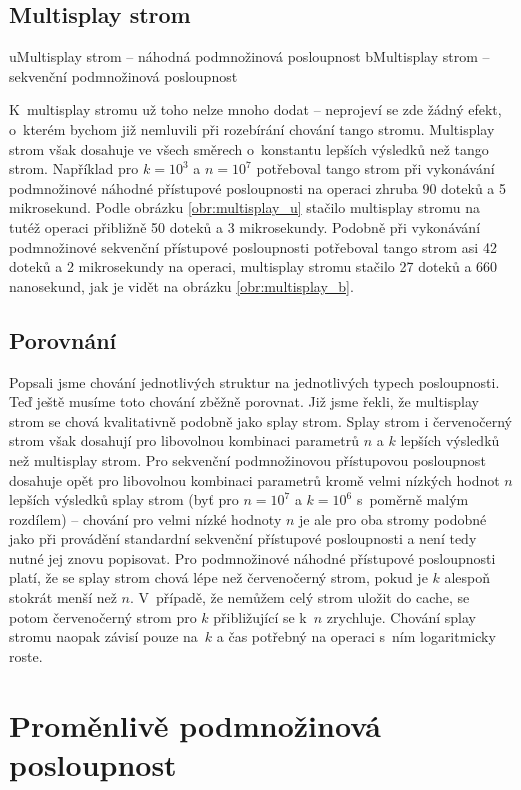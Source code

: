 \subsection {Multisplay strom}

u{Multisplay strom -- náhodná podmnožinová posloupnost}
b{Multisplay strom -- sekvenční podmnožinová posloupnost}

K~multisplay stromu už toho nelze mnoho dodat -- neprojeví se zde žádný efekt,
o~kterém bychom již nemluvili při rozebírání chování tango stromu. Multisplay
strom však dosahuje ve všech směrech o~konstantu lepších výsledků než tango
strom. Například pro $k=10^3$ a $n= 10^7$ potřeboval tango strom
při vykonávání podmnožinové náhodné přístupové posloupnosti na operaci zhruba
90 doteků a 5 mikrosekund. Podle obrázku \ref{obr:multisplay_u} stačilo
multisplay stromu na tutéž operaci přibližně 50 doteků a 3 mikrosekundy.
Podobně při vykonávání podmnožinové sekvenční přístupové posloupnosti
potřeboval tango strom asi 42 doteků a 2 mikrosekundy na operaci, multisplay
stromu stačilo 27 doteků a 660 nanosekund, jak je vidět na obrázku
\ref{obr:multisplay_b}.

\subsection{Porovnání}

Popsali jsme chování jednotlivých struktur na jednotlivých typech posloupnosti.
Teď ještě musíme toto chování zběžně porovnat. Již jsme řekli, že multisplay
strom se chová kvalitativně podobně jako splay strom. Splay strom i
červenočerný strom však dosahují pro libovolnou kombinaci parametrů $n$ a $k$
lepších výsledků než multisplay strom. Pro sekvenční podmnožinovou přístupovou
posloupnost dosahuje opět pro libovolnou kombinaci parametrů kromě velmi
nízkých hodnot $n$  lepších výsledků splay strom (byť pro $n= 10^7$ a
$k= 10^6$ s~poměrně malým rozdílem) -- chování pro velmi nízké hodnoty
$n$ je ale pro oba stromy podobné jako při provádění standardní sekvenční
přístupové posloupnosti a není tedy nutné jej znovu popisovat. Pro podmnožinové
náhodné přístupové posloupnosti platí, že se splay strom chová lépe než
červenočerný strom, pokud je $k$ alespoň stokrát menší než $n$. V~případě, že
nemůžem celý strom uložit do cache, se potom červenočerný strom pro $k$
přibližující se k~$n$ zrychluje. Chování splay stromu naopak závisí pouze na~$k$ a čas potřebný na operaci s~ním logaritmicky roste.
\newpage
\section{Proměnlivě podmnožinová posloupnost}

